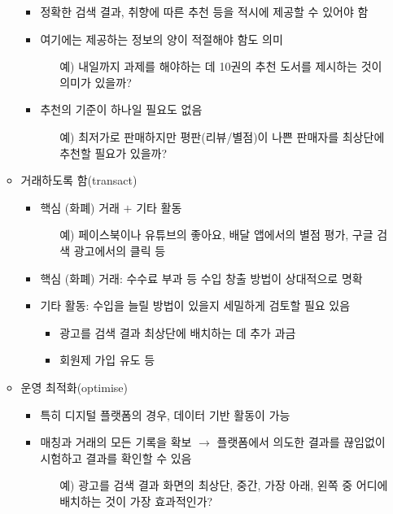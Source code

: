 \begin{itemize}
\begin{itemize}
\begin{itemize}
		\item 정확한 검색 결과, 취향에 따른 추천 등을 적시에 제공할 수 있어야 함
		\item 여기에는 제공하는 정보의 양이 적절해야 함도 의미
			\begin{itemize}
			\item[예)] 내일까지 과제를 해야하는 데 10권의 추천 도서를 제시하는 것이 의미가 있을까? 
			\end{itemize}
		\item 추천의 기준이 하나일 필요도 없음
			\begin{itemize}
			\item[예)] 최저가로 판매하지만 평판(리뷰/별점)이 나쁜 판매자를 최상단에 추천할 필요가 있을까?
			\end{itemize}
		\end{itemize}
	\item 거래하도록 함(transact)
		\begin{itemize}
		\item 핵심 (화폐) 거래 $+$ 기타 활동
			\begin{itemize}
			\item[예)] 페이스북이나 유튜브의 좋아요, 배달 앱에서의 별점 평가, 구글 검색 광고에서의 클릭 등 
			\end{itemize}
		\item 핵심 (화폐) 거래: 수수료 부과 등 수입 창출 방법이 상대적으로 명확
		\item 기타 활동: 수입을 늘릴 방법이 있을지 세밀하게 검토할 필요 있음
			\begin{itemize}
			\item 광고를 검색 결과 최상단에 배치하는 데 추가 과금
			\item 회원제 가입 유도 등
			\end{itemize}
		\end{itemize}
	\item 운영 최적화(optimise)
		\begin{itemize}
		\item 특히 디지털 플랫폼의 경우, 데이터 기반 활동이 가능
		\item 매칭과 거래의 모든 기록을 확보 $\rightarrow$ 플랫폼에서 의도한 결과를 끊임없이 시험하고 결과를 확인할 수 있음
			\begin{itemize}
			\item[예)] 광고를 검색 결과 화면의 최상단, 중간, 가장 아래, 왼쪽 중 어디에 배치하는 것이 가장 효과적인가?  
			\end{itemize}  
		\end{itemize}
	\end{itemize}

\end{itemize}
